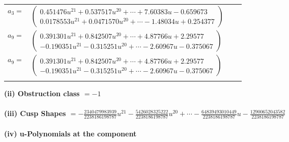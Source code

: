 \documentclass[1p]{elsarticle_modified}
\theoremstyle{definition}
\begin{document}
\begin{tabular}{m{7pt} m{180pt} m{7pt} m{180pt} }
\flushright $a_{3}=$&$\begin{pmatrix}0.451476 u^{21}+0.537517 u^{20}+\cdots+7.60383 u-0.659673\\0.0178553 u^{21}+0.0471570 u^{20}+\cdots-1.48034 u+0.254377\end{pmatrix}$ \\
\flushright $a_{9}=$&$\begin{pmatrix}0.391301 u^{21}+0.842507 u^{20}+\cdots+4.87766 u+2.29577\\-0.190351 u^{21}-0.315251 u^{20}+\cdots-2.60967 u-0.375067\end{pmatrix}$\\ \flushright $a_{9}=$&$\begin{pmatrix}0.391301 u^{21}+0.842507 u^{20}+\cdots+4.87766 u+2.29577\\-0.190351 u^{21}-0.315251 u^{20}+\cdots-2.60967 u-0.375067\end{pmatrix}$\\&\end{tabular}
\flushleft \textbf{(ii) Obstruction class $= -1$}\\~\\
\flushleft \textbf{(iii) Cusp Shapes $= -\frac{2340479983939}{2238186198787} u^{21}-\frac{5426028325222}{2238186198787} u^{20}+\cdots-\frac{64839493010449}{2238186198787} u-\frac{12900652043582}{2238186198787}$}\\~\\
\newpage\renewcommand{\arraystretch}{1}
\flushleft \textbf{(iv) u-Polynomials at the component}\newline \\
\end{document}
